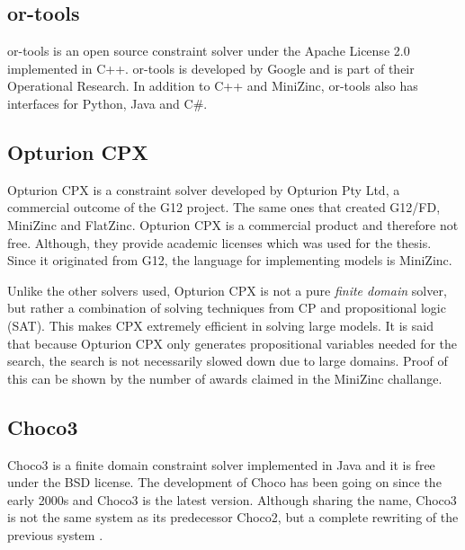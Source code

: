 \subsection{or-tools}
or-tools is an open source constraint solver under the Apache License 2.0 implemented in C++. or-tools is developed by Google and is part of their Operational Research. In addition to C++ and MiniZinc, or-tools also has interfaces for Python, Java and C\#.
\cite{or_manual}
\subsection{Opturion CPX}
Opturion CPX is a constraint solver developed by Opturion Pty Ltd, a commercial outcome of the G12 project. The same ones that created G12/FD, MiniZinc and FlatZinc. Opturion CPX is a commercial product and therefore not free. Although, they provide academic licenses which was used for the thesis. Since it originated from G12, the language for implementing models is MiniZinc.

Unlike the other solvers used, Opturion CPX is not a pure \emph{finite domain} solver, but rather a combination of solving techniques from CP and propositional logic (SAT). This makes CPX extremely efficient in solving large models.
It is said that because Opturion CPX only generates propositional variables needed for the search, the search is not necessarily slowed down due to large domains.
Proof of this can be shown by the number of awards claimed in the MiniZinc challange.
\cite{cpx}
\cite{cpx_about}
\cite{cpx_site}
\subsection{Choco3}
Choco3 is a finite domain \cite{choco_paper} constraint solver implemented in Java and it is free under the BSD license. The development of Choco has been going on since the early 2000s and Choco3 is the latest version. Although sharing the name, Choco3 is not the same system as its predecessor Choco2, but a complete rewriting of the previous system \cite{choco}.